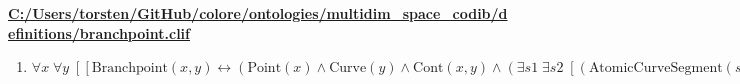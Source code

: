 \documentclass{article}
\begin{document}
\textbf{\url{C:/Users/torsten/GitHub/colore/ontologies/multidim\_space\_codib/definitions/branchpoint.clif}}

\begin{enumerate}
\item $\forall x\; \forall y\;  \left[ \left[ \textrm{Branchpoint}(x,y) \leftrightarrow \left(\textrm{Point}(x) \land \textrm{Curve}(y) \land \textrm{Cont}(x,y) \land \left(\exists s1\; \exists s2\;  \left[ \left(\textrm{AtomicCurveSegment}(s1) \land \textrm{AtomicLoopCurve}(s2) \land \textrm{Cont}(s1,y) \land \textrm{Cont}(s2,y) \land \neg \left(\textrm{=}(s1,s2)\right) \land \textrm{Cont}(x,s1) \land \textrm{Cont}(x,s2)\right) \right] \lor \exists s1\; \exists s2\; \exists s3\;  \left[ \left(\textrm{AtomicCurveSegment}(s1) \land \textrm{AtomicCurveSegment}(s2) \land \textrm{AtomicCurveSegment}(s3) \land \textrm{Cont}(s1,y) \land \textrm{Cont}(s2,y) \land \textrm{Cont}(s3,y) \land \neg \left(\textrm{=}(s1,s2)\right) \land \neg \left(\textrm{=}(s1,s3)\right) \land \neg \left(\textrm{=}(s2,s3)\right) \land \textrm{Cont}(x,s1) \land \textrm{Cont}(x,s2) \land \textrm{Cont}(x,s3)\right) \right]\right)\right) \right] \right]$
\end{enumerate}
\end{document}
